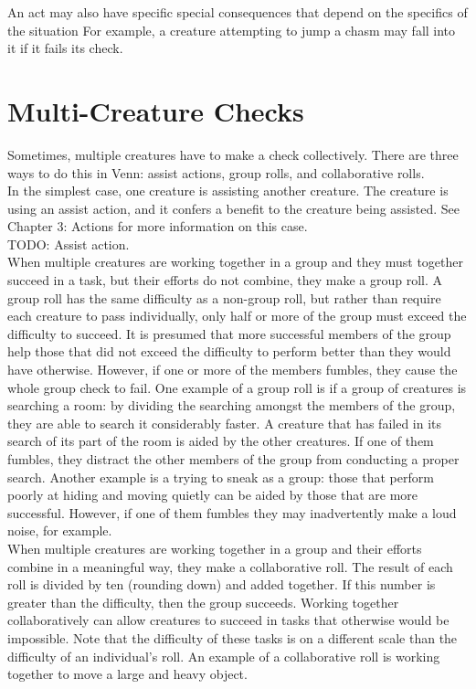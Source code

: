 \documentclass[letterpaper,titlepage,openany,twocolumn]{book}
\begin{document}
An act may also have specific special consequences that depend on the specifics of the situation For example, a creature attempting to jump a chasm may fall into it if it fails its check.\\

\section{Multi-Creature Checks}
Sometimes, multiple creatures have to make a check collectively. There are three ways to do this in Venn: assist actions, group rolls, and collaborative rolls.\\

In the simplest case, one creature is assisting another creature. The creature is using an assist action, and it confers a benefit to the creature being assisted. See Chapter 3: Actions for more information on this case.\\
TODO: Assist action.\\

When multiple creatures are working together in a group and they must together succeed in a task, but their efforts do not combine, they make a group roll. A group roll has the same difficulty as a non-group roll, but rather than require each creature to pass individually, only half or more of the group must exceed the difficulty to succeed. It is presumed that more successful members of the group help those that did not exceed the difficulty to perform better than they would have otherwise. However, if one or more of the members fumbles, they cause the whole group check to fail. One example of a group roll is if a group of creatures is searching a room: by dividing the searching amongst the members of the group, they are able to search it considerably faster. A creature that has failed in its search of its part of the room is aided by the other creatures. If one of them fumbles, they distract the other members of the group from conducting a proper search. Another example is a trying to sneak as a group: those that perform poorly at hiding and moving quietly can be aided by those that are more successful. However, if one of them fumbles they may inadvertently make a loud noise, for example.\\

When multiple creatures are working together in a group and their efforts combine in a meaningful way, they make a collaborative roll. The result of each roll is divided by ten (rounding down) and added together. If this number is greater than the difficulty, then the group succeeds. Working together collaboratively can allow creatures to succeed in tasks that otherwise would be impossible. Note that the difficulty of these tasks is on a different scale than the difficulty of an individual’s roll. An example of a collaborative roll is working together to move a large and heavy object.\\
\end{document}

